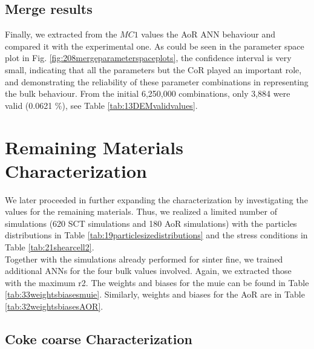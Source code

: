 \subsection{Merge results}
\label{subsec:mergeresults}

Finally, we extracted from the $MC1$ values the \acs{AoR} \acs{ANN} behaviour
and compared it with the experimental one.
As could be seen in the parameter space plot in Fig.
\ref{fig:208mergeparameterspaceplots}, the confidence interval is very small,
indicating that all the parameters but the \acs{CoR} played an important role, 
and demonstrating the reliability of these parameter
combinations in representing the bulk behaviour.
From the initial 6,250,000 combinations, only 3,884 were valid (0.0621
\%), see Table \ref{tab:13DEMvalidvalues}.






\section{Remaining Materials Characterization}
\label{sec:remainingmaterialscharacterization}

We later proceeded in further expanding the characterization by investigating
the values for the remaining materials.
Thus, we realized a limited number of simulations (620 \acs{SCT} simulations
and 180 \acs{AoR} simulations) with the particles distributions in Table
\ref{tab:19particlesizedistributions} and the stress conditions in Table
\ref{tab:21shearcell2}.\\
Together with the simulations already performed for sinter fine, we trained
additional \acs{ANNs} for the four bulk values involved.
Again, we extracted those with the maximum \acs{r2}.
The weights and biases for the \acs{muie} can be found in Table
\ref{tab:33weightsbiasesmuie}.
Similarly, weights and biases for the \acs{AoR} are in Table
\ref{tab:32weightsbiasesAOR}.





\subsection{Coke coarse Characterization}
\label{subsec:cokecoarsecharacterization}

